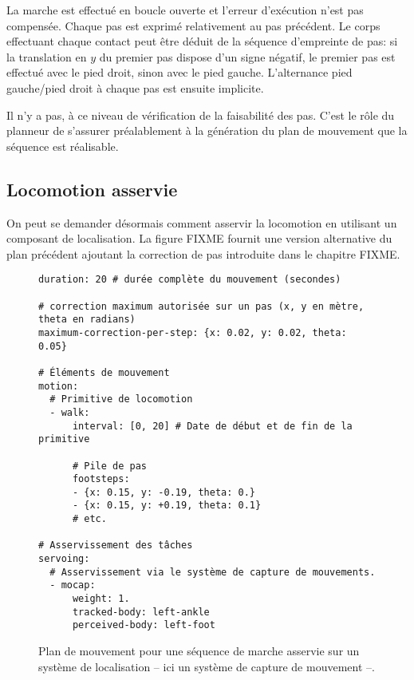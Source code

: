 La marche est effectué en boucle ouverte et l'erreur d'exécution n'est
pas compensée. Chaque pas est exprimé relativement au pas
précédent. Le corps effectuant chaque contact peut être déduit de la
séquence d'empreinte de pas: si la translation en $y$ du premier pas
dispose d'un signe négatif, le premier pas est effectué avec le pied
droit, sinon avec le pied gauche. L'alternance pied gauche/pied droit
à chaque pas est ensuite implicite.


Il n'y a pas, à ce niveau de vérification de la faisabilité des
pas. C'est le rôle du planneur de s'assurer préalablement à la
génération du plan de mouvement que la séquence est réalisable.

\FloatBarrier

\subsection{Locomotion asservie}

On peut se demander désormais comment asservir la locomotion en
utilisant un composant de localisation. La figure FIXME fournit une
version alternative du plan précédent ajoutant la correction de pas
introduite dans le chapitre FIXME.

\begin{figure}
  \begin{center}
\begin{verbatim}
duration: 20 # durée complète du mouvement (secondes)

# correction maximum autorisée sur un pas (x, y en mètre, theta en radians)
maximum-correction-per-step: {x: 0.02, y: 0.02, theta: 0.05}

# Éléments de mouvement
motion:
  # Primitive de locomotion
  - walk:
      interval: [0, 20] # Date de début et de fin de la primitive

      # Pile de pas
      footsteps:
      - {x: 0.15, y: -0.19, theta: 0.}
      - {x: 0.15, y: +0.19, theta: 0.1}
      # etc.

# Asservissement des tâches
servoing:
  # Asservissement via le système de capture de mouvements.
  - mocap:
      weight: 1.
      tracked-body: left-ankle
      perceived-body: left-foot
\end{verbatim}
  \end{center}
  \caption{Plan de mouvement pour une séquence de marche asservie sur
    un système de localisation -- ici un système de capture de
    mouvement --.}
\end{figure}

